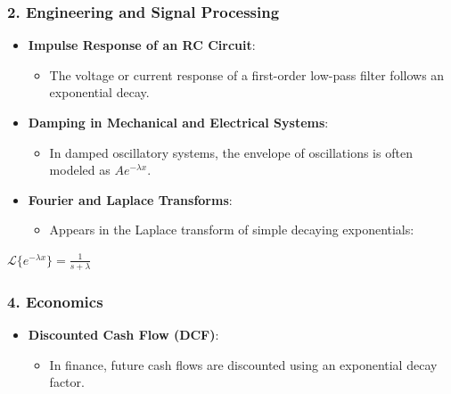 \documentclass[11pt]{article}
\providecommand{\tightlist}{%
      \setlength{\itemsep}{0pt}\setlength{\parskip}{0pt}}
\begin{document}
\subsubsection{\texorpdfstring{\textbf{2. Engineering and Signal
Processing}}{2. Engineering and Signal Processing}}\label{engineering-and-signal-processing}

\begin{itemize}
\tightlist
\item
  \textbf{Impulse Response of an RC Circuit}:

  \begin{itemize}
  \tightlist
  \item
    The voltage or current response of a first-order low-pass filter
    follows an exponential decay.
  \end{itemize}
\item
  \textbf{Damping in Mechanical and Electrical Systems}:

  \begin{itemize}
  \tightlist
  \item
    In damped oscillatory systems, the envelope of oscillations is often
    modeled as \(A e^{-\lambda x}\).
  \end{itemize}
\item
  \textbf{Fourier and Laplace Transforms}:

  \begin{itemize}
  \tightlist
  \item
    Appears in the Laplace transform of simple decaying exponentials:
  \end{itemize}
\end{itemize}

\(\mathcal{L} \{ e^{-\lambda x} \} = \frac{1}{s + \lambda}\)

\subsubsection{\texorpdfstring{\textbf{4.
Economics}}{4. Economics}}\label{economics}

\begin{itemize}
\tightlist
\item
  \textbf{Discounted Cash Flow (DCF)}:

  \begin{itemize}
  \tightlist
  \item
    In finance, future cash flows are discounted using an exponential
    decay factor.
  \end{itemize}
\end{itemize}
\end{document}
